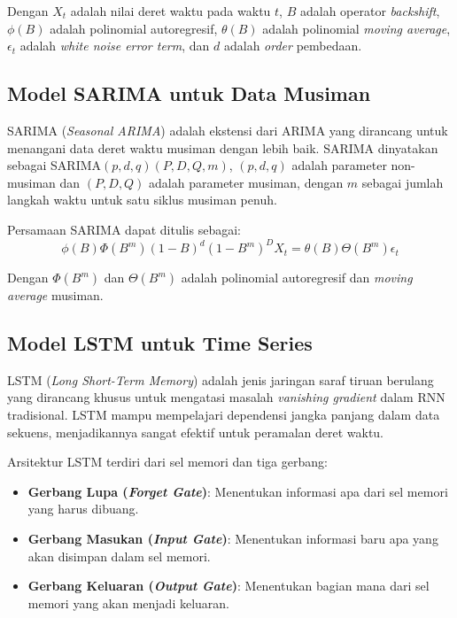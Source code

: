 Dengan $X_t$ adalah nilai deret waktu pada waktu $t$, $B$ adalah operator \textit{backshift}, $\phi(B)$ adalah polinomial autoregresif, $\theta(B)$ adalah polinomial \textit{moving average}, $\epsilon_t$ adalah \textit{white noise error term}, dan $d$ adalah \textit{order} pembedaan.

\subsection{Model SARIMA untuk Data Musiman}

SARIMA (\textit{Seasonal ARIMA}) adalah ekstensi dari ARIMA yang dirancang untuk menangani data deret waktu musiman dengan lebih baik. SARIMA dinyatakan sebagai SARIMA$(p, d, q)(P, D, Q, m)$, $(p, d, q)$ adalah parameter non-musiman dan $(P, D, Q)$ adalah parameter musiman, dengan $m$ sebagai jumlah langkah waktu untuk satu siklus musiman penuh.

Persamaan SARIMA dapat ditulis sebagai:
\begin{equation}
\phi(B)\Phi(B^m)(1-B)^d(1-B^m)^D X_t = \theta(B)\Theta(B^m) \epsilon_t
\end{equation}

Dengan $\Phi(B^m)$ dan $\Theta(B^m)$ adalah polinomial autoregresif dan \textit{moving average} musiman.

\subsection{Model LSTM untuk Time Series}

LSTM (\textit{Long Short-Term Memory}) adalah jenis jaringan saraf tiruan berulang yang dirancang khusus untuk mengatasi masalah \textit{vanishing gradient} dalam RNN tradisional. LSTM mampu mempelajari dependensi jangka panjang dalam data sekuens, menjadikannya sangat efektif untuk peramalan deret waktu.

Arsitektur LSTM terdiri dari sel memori dan tiga gerbang:
\begin{itemize}
\item \textbf{Gerbang Lupa (\textit{Forget Gate})}: Menentukan informasi apa dari sel memori yang harus dibuang.
\item \textbf{Gerbang Masukan (\textit{Input Gate})}: Menentukan informasi baru apa yang akan disimpan dalam sel memori.
\item \textbf{Gerbang Keluaran (\textit{Output Gate})}: Menentukan bagian mana dari sel memori yang akan menjadi keluaran.
\end{itemize}

